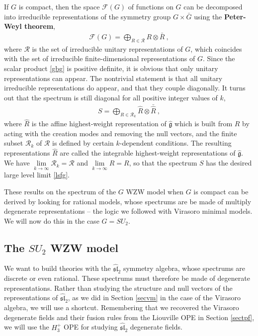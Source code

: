 \documentclass[12pt,a4paper,notitlepage]{report}
\numberwithin{equation}{section}
\theoremstyle{break}
\begin{document}
If $G$ is compact, then the space $\mathcal{F}(G)$ of functions on $G$ can be decomposed into irreducible representations of the symmetry group $G\times \bar{G}$ using the \textbf{\boldmath Peter-Weyl theorem}, 
\begin{align}
 \mathcal{F}(G) = \bigoplus_{R\in \mathcal{R}} R\otimes \bar{R}\ ,
\end{align}
where $\mathcal{R}$ is the set of irreducible unitary representations of $G$, which coincides with the set of irreducible finite-dimensional representations of $G$.
Since the scalar product \eqref{gbg} is positive definite, it is obvious that only unitary representations can appear.
The nontrivial statement is that all unitary irreducible representations do appear, and that they couple diagonally. 
It turns out that the spectrum is still diagonal for all positive integer values of $k$, \cite{fms97}
\begin{align}
 S = \bigoplus_{R\in \mathcal{R}_k} \hat{R}\otimes \bar{\hat{R}}\ ,
\end{align}
where $\hat{R}$ is the affine highest-weight representation of $\hat{\mathfrak{g}}$ which is built from $R$ by acting with the creation modes and removing the null vectors, and the finite subset $\mathcal{R}_k$ of $\mathcal{R}$ is defined by certain $k$-dependent conditions.
The resulting representations $\hat{R}$ are called the integrable highest-weight representations of $\hat{\mathfrak{g}}$. 
We have $\underset{k\rightarrow\infty}{\lim} \mathcal{R}_k =\mathcal{R}$ and $\underset{k\rightarrow \infty}{\lim} \hat{R} = R$, so that the spectrum $S$ has the desired large level limit \eqref{lsfg}.

These results on the spectrum of the $G$ WZW model when $G$ is compact can be derived by looking for rational models, whose spectrums are be made of multiply degenerate representations -- the logic we followed with Virasoro minimal models.
We will now do this in the case $G=SU_2$.   


\subsection{The \texorpdfstring{$SU_2$}{SU(2)} WZW model \label{secsu}}

We want to build theories with the $\widehat{\mathfrak{sl}}_2$ symmetry algebra, whose spectrums are discrete or even rational.
These spectrums must therefore be made of degenerate representations.
Rather than studying the structure and null vectors of the representations of $\widehat{\mathfrak{sl}}_2$, as we did in Section \ref{secvm} in the case of the Virasoro algebra, 
we will use a shortcut.
Remembering that we recovered
the Virasoro degenerate fields and their fusion rules from the Liouville OPE in Section \ref{sectpf},
we will use the $H_3^+$ OPE for studying $\widehat{\mathfrak{sl}}_2$ degenerate fields. 
\end{document}
